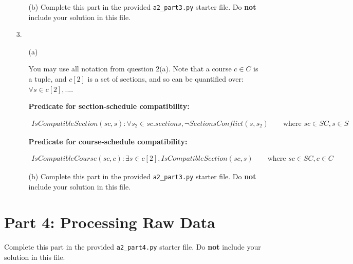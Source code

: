\documentclass[fontsize=11pt]{article}
\begin{document}
\begin{enumerate}
\begin{enumerate}
\item[(b)]
Complete this part in the provided \texttt{a2\_part3.py} starter file.
Do \textbf{not} include your solution in this file.
\end{enumerate}

\item[3.]

\begin{enumerate}
\item[(a)]

You may use all notation from question 2(a).
Note that a course $c \in C$ is a tuple, and $c[2]$ is a set of sections, and so can be quantified over: $\forall s \in c[2], ...$.

\smallskip

\textbf{Predicate for section-schedule compatibility:}

\begin{align*}
IsCompatibleSection(sc, s) : \forall s_2 \in sc.sections, \lnot SectionsConflict(s, s_2)
\qquad \text{where $sc \in SC, s \in S$}
\end{align*}

\smallskip

\textbf{Predicate for course-schedule compatibility:}

\begin{align*}
IsCompatibleCourse(sc, c) : \exists s \in c[2], IsCompatibleSection(sc, s)
\qquad \text{where $sc \in SC, c \in C$}
\end{align*}

\item[(b)]
Complete this part in the provided \texttt{a2\_part3.py} starter file.
Do \textbf{not} include your solution in this file.
\end{enumerate}

\end{enumerate}

\section*{Part 4: Processing Raw Data}
Complete this part in the provided \texttt{a2\_part4.py} starter file.
Do \textbf{not} include your solution in this file.
\end{document}
